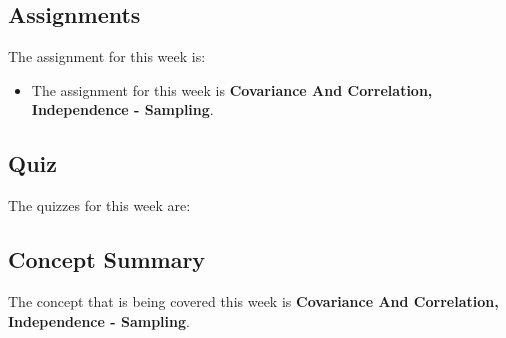 \subsection{Assignments}

The assignment for this week is:

\begin{itemize}
    \item The assignment for this week is \textbf{Covariance And Correlation, Independence - Sampling}. 
\end{itemize}

\subsection{Quiz}

The quizzes for this week are:

\begin{itemize}
     \textbullet {} 
\end{itemize}

\subsection{Concept Summary}

The concept that is being covered this week is \textbf{Covariance And Correlation, Independence - Sampling}.

